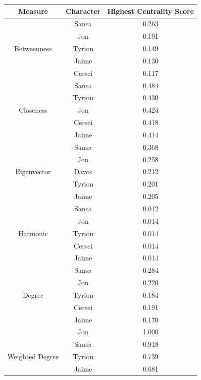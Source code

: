 \documentclass[10pt,twocolumn,letterpaper]{article}
\begin{document}
\begin{table}[!h]
    \centering
    \small
    \begin{tabular}{c|c|c}
        Measure & Character & \small{Highest Centrality Score} \\
        \hline
                    & Sansa & 0.263 \\
                    & Jon & 0.191 \\
        Betweenness & Tyrion & 0.149 \\
                    & Jaime & 0.130 \\
                    & Cersei & 0.117 \\
        \hline 
                    & Sansa & 0.484 \\
                    & Tyrion & 0.430 \\
        Closeness   & Jon & 0.424 \\
                    & Cersei & 0.418 \\
                    & Jaime & 0.414 \\
        \hline 
                    & Sansa & 0.368 \\
                    & Jon & 0.258 \\
        Eigenvector & Davos & 0.212 \\
                    & Tyrion & 0.201 \\
                    & Jaime & 0.205 \\
        \hline 
                    & Sansa & 0.012 \\
                    & Jon & 0.014 \\
        Harmonic    & Tyrion & 0.014 \\
                    & Cersei & 0.014 \\
                    & Jaime & 0.014 \\
        \hline
                    & Sansa & 0.284 \\
                    & Jon & 0.220 \\
        Degree      & Tyrion & 0.184 \\
                    & Cersei & 0.191 \\
                    & Jaime & 0.170 \\
        \hline
                    & Jon & 1.000 \\
                    & Sansa & 0.918 \\
        Weighted Degree & Tyrion & 0.739 \\
                    & Jaime & 0.681 \\

\end{tabular}
\end{table}
\end{document}
